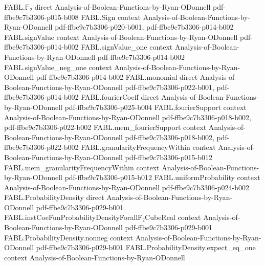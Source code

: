 \begin{theorem}
\label{FABL.density_convolution_apply}
\leanok
{}
\proofstep
  {FABL.𝔽₂}
  {direct}
  {Analysis-of-Boolean-Functions-by-Ryan-ODonnell}
  {pdf-ffbe9c7b3306-p015-b008}
\proofstep
  {FABL.Sign}
  {context}
  {Analysis-of-Boolean-Functions-by-Ryan-ODonnell}
  {pdf-ffbe9c7b3306-p020-b001,
    pdf-ffbe9c7b3306-p014-b002}
\proofstep
  {FABL.signValue}
  {context}
  {Analysis-of-Boolean-Functions-by-Ryan-ODonnell}
  {pdf-ffbe9c7b3306-p014-b002}
\proofstep
  {FABL.signValue_one}
  {context}
  {Analysis-of-Boolean-Functions-by-Ryan-ODonnell}
  {pdf-ffbe9c7b3306-p014-b002}
\proofstep
  {FABL.signValue_neg_one}
  {context}
  {Analysis-of-Boolean-Functions-by-Ryan-ODonnell}
  {pdf-ffbe9c7b3306-p014-b002}
\proofstep
  {FABL.monomial}
  {direct}
  {Analysis-of-Boolean-Functions-by-Ryan-ODonnell}
  {pdf-ffbe9c7b3306-p022-b001,
    pdf-ffbe9c7b3306-p014-b002}
\proofstep
  {FABL.fourierCoeff}
  {direct}
  {Analysis-of-Boolean-Functions-by-Ryan-ODonnell}
  {pdf-ffbe9c7b3306-p025-b004}
\proofstep
  {FABL.fourierSupport}
  {context}
  {Analysis-of-Boolean-Functions-by-Ryan-ODonnell}
  {pdf-ffbe9c7b3306-p018-b002,
    pdf-ffbe9c7b3306-p022-b002}
\proofstep
  {FABL.mem_fourierSupport}
  {context}
  {Analysis-of-Boolean-Functions-by-Ryan-ODonnell}
  {pdf-ffbe9c7b3306-p018-b002,
    pdf-ffbe9c7b3306-p022-b002}
\proofstep
  {FABL.granularityFrequencyWithin}
  {context}
  {Analysis-of-Boolean-Functions-by-Ryan-ODonnell}
  {pdf-ffbe9c7b3306-p015-b012}
\proofstep
  {FABL.mem_granularityFrequencyWithin}
  {context}
  {Analysis-of-Boolean-Functions-by-Ryan-ODonnell}
  {pdf-ffbe9c7b3306-p015-b012}
\proofstep
  {FABL.uniformProbability}
  {context}
  {Analysis-of-Boolean-Functions-by-Ryan-ODonnell}
  {pdf-ffbe9c7b3306-p024-b002}
\proofstep
  {FABL.ProbabilityDensity}
  {direct}
  {Analysis-of-Boolean-Functions-by-Ryan-ODonnell}
  {pdf-ffbe9c7b3306-p029-b001}
\proofstep
  {FABL.instCoeFunProbabilityDensityForallF₂CubeReal}
  {context}
  {Analysis-of-Boolean-Functions-by-Ryan-ODonnell}
  {pdf-ffbe9c7b3306-p029-b001}
\proofstep
  {FABL.ProbabilityDensity.nonneg}
  {context}
  {Analysis-of-Boolean-Functions-by-Ryan-ODonnell}
  {pdf-ffbe9c7b3306-p029-b001}
\proofstep
  {FABL.ProbabilityDensity.expect_eq_one}
  {context}
  {Analysis-of-Boolean-Functions-by-Ryan-ODonnell}

\end{theorem}
